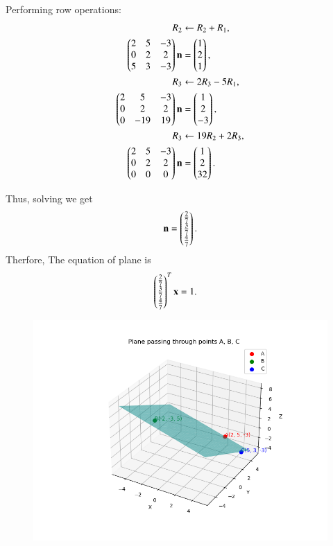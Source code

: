 \documentclass[journal]{IEEEtran}
\begin{document}
Performing row operations:
\begin{align}
R_2 &\leftarrow R_2 + R_1, \\
\begin{pmatrix}2 & 5 & -3 \\ 0 & 2 & 2 \\ 5 & 3 & -3\end{pmatrix}\mathbf{n}
&= \begin{pmatrix}1 \\ 2 \\ 1\end{pmatrix},\\
R_3 &\leftarrow 2R_3 - 5R_1, \\
\begin{pmatrix}2 & 5 & -3 \\ 0 & 2 & 2 \\ 0 & -19 & 19\end{pmatrix}\mathbf{n}
&= \begin{pmatrix}1 \\ 2 \\ -3\end{pmatrix},\\ 
R_3 &\leftarrow 19R_2 + 2R_3, \\
\begin{pmatrix}2 & 5 & -3 \\ 0 & 2 & 2 \\ 0 & 0 & 0\end{pmatrix}\mathbf{n}
&= \begin{pmatrix}1 \\ 2 \\ 32\end{pmatrix}.
\end{align}

Thus, solving we get
\begin{align}
\mathbf{n} = \begin{pmatrix}\tfrac{2}{7} \\ \tfrac{3}{7} \\ \tfrac{4}{7}\end{pmatrix}.
\end{align}
Therfore,
The equation of plane is
\begin{align}
	\begin{pmatrix}\tfrac{2}{7} \\ \tfrac{3}{7} \\ \tfrac{4}{7}\end{pmatrix}^T\mathbf{x} &= 1.
\end{align}
\begin{figure}[h!]
  \centering
   \includegraphics[width=0.7\linewidth]{../figs/plane_plot.png}
   \caption{}
  \label{stemplot}
\end{figure}
\end{document}
